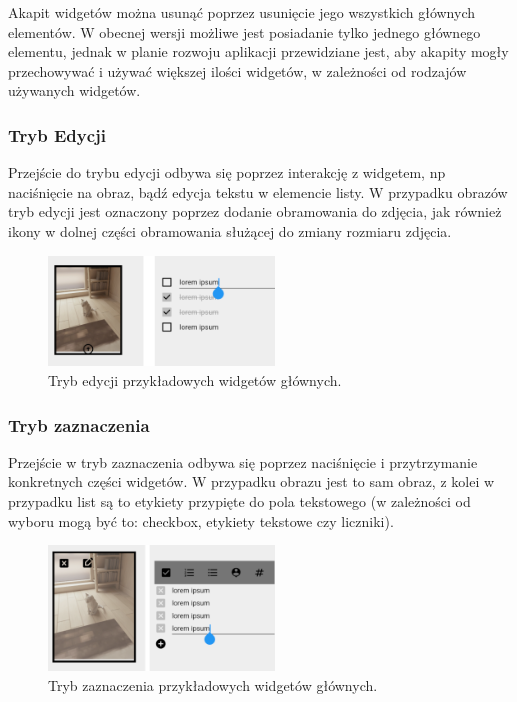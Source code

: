 Akapit widgetów można usunąć poprzez usunięcie jego wszystkich głównych elementów. W obecnej wersji możliwe jest posiadanie tylko jednego głównego elementu, jednak w planie rozwoju aplikacji przewidziane jest, aby akapity mogły przechowywać i używać większej ilości widgetów, w zależności od rodzajów używanych widgetów.

\subsubsection{Tryb Edycji}

Przejście do trybu edycji odbywa się poprzez interakcję z widgetem, np naciśnięcie na obraz, bądź edycja tekstu w elemencie listy.
W przypadku obrazów tryb edycji jest oznaczony poprzez dodanie obramowania do zdjęcia, jak również ikony w dolnej części obramowania służącej do zmiany rozmiaru zdjęcia.

\begin{figure}[ht]
    \centering
    \includegraphics[width=6cm]{images/tryb_edycji.png}
    \caption{Tryb edycji przykładowych widgetów głównych.}
    \vspace{3mm}
\end{figure}

\subsubsection{Tryb zaznaczenia}

Przejście w tryb zaznaczenia odbywa się poprzez naciśnięcie i przytrzymanie konkretnych części widgetów. W przypadku obrazu jest to sam obraz, z kolei w przypadku list są to etykiety przypięte do pola tekstowego (w zależności od wyboru mogą być to: checkbox, etykiety tekstowe czy liczniki).

\begin{figure}[ht]
    \centering
    \includegraphics[width=6cm]{images/tryb_zaznaczenia.png}
    \caption{Tryb zaznaczenia przykładowych widgetów głównych.}
    \label{fig:trybZaznaczenia}
    \vspace{3mm}
\end{figure}


